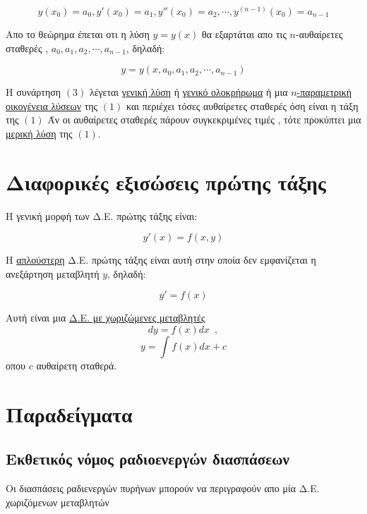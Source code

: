 \documentclass[12pt,a4paper]{article}
\begin{document}
\begin{itemize}
\begin{equation*}
y(x_0)=a_0,y'(x_0)=a_1, y''(x_0)=a_2,\cdots,y^{(n-1)}(x_0)=a_{n-1}
\end{equation*}

Απο το θεώρημα έπεται οτι η λύση $y=y(x)$ θα εξαρτάται απο τις $n$-αυθαίρετες σταθερές , $a_0,a_1,a_2,\cdots, a_{n-1}$, δηλαδή:

\begin{equation}
y=y\left(x,a_0,a_1,a_2,\cdots, a_{n-1}\right)
\end{equation}

Η συνάρτηση $(3)$ λέγεται \underline{γενική λύση} ή \underline{γενικό ολοκρήρωμα} ή μια \underline{$n$-παραμετρική} \\ \underline{οικογένεια λύσεων} της $(1)$ και περιέχει τόσες αυθαίρετες σταθερές  όση είναι η τάξη της $(1)$
Άν οι αυθαίρετες σταθερές πάρουν συγκεκριμένες τιμές , τότε προκύπτει μια \underline{μερική λύση} της $(1)$.

\vspace{12cm}

\section{Διαφορικές εξισώσεις πρώτης τάξης}
Η γενική μορφή των Δ.Ε. πρώτης τάξης είναι:

\[
y'(x)=f(x,y) \tag{1}
\]

Η \underline{απλούστερη} Δ.Ε. πρώτης τάξης είναι αυτή στην οποία δεν εμφανίζεται η ανεξάρτηση μεταβλητή $y$, δηλαδή:

\[
y'=f(x) \tag{2}
\]

Αυτή είναι μια \underline{Δ.Ε. με χωριζώμενες μεταβλητές} 
\[ dy =f(x)dx \, \, \,  ,\]  
\[
y=\int f(x)dx + c \tag{3}
\]
οπου $c$ αυθαίρετη σταθερά.

\end{itemize}

\vspace{20mm}

\section*{Παραδείγματα}

\subsection{Εκθετικός νόμος ραδιοενεργών διασπάσεων}
Οι διασπάσεις ραδιενεργών πυρήνων μπορούν να περιγραφούν απο μία Δ.Ε. χωριζόμενων μεταβλητών
\end{document}
